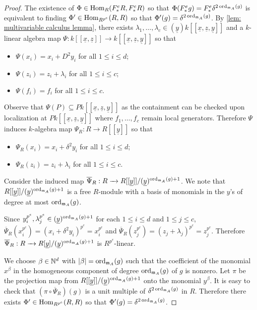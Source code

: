 \documentclass[12pt]{amsart}
\numberwithin{equation}{theorem}
\theoremstyle{plain}
\newcommand{\fm}{\mathfrak{m}}
\begin{document}
\begin{proof}
    The existence of $\Phi\in \operatorname{Hom}_R(F^e_*R,F^e_*R)$ so that $\Phi(F^e_*g) = F^e_*\delta^{2\ord_{\fm_A}(g)}$ is equivalent to finding $\Phi'\in \operatorname{Hom}_{R^{p^e}}(R,R)$ so that $\Phi'(g) = \delta^{2\ord_{\fm_A}(g)}$. By \cref{lem: multivariable calculus lemma}, there exists $\lambda_1,\ldots, \lambda_c\in (\underline{y})k[[\underline{x},\underline{z},\underline{y}]]$ and a $k$-linear algebra map $\Psi:k[[\underline{x},\underline{z}]]\to k[[\underline{x},\underline{z},\underline{y}]]$ so that 
    \begin{itemize}
        \item $\Psi(x_i) = x_i+D^2y_i$ for all $1\leq i\leq d$;
        \item $\Psi(z_i) = z_i + \lambda_i$ for all $1\leq i\leq c$;
        \item $\Psi(f_i) = f_i$ for all $1\leq i\leq c$.
    \end{itemize}
    Observe that $\Psi(P)\subseteq Pk[[\underline{x},\underline{z},\underline{y}]]$ as the containment can be checked upon localization at $Pk[[\underline{x},\underline{z},\underline{y}]]$ where $f_1,\ldots,f_c$ remain local generators. Therefore $\Psi$ induces $k$-algebra map $\Psi_R: R\to R[[\underline{y}]]$ so that 
    \begin{itemize}
        \item $\Psi_R(x_i) = x_i+\delta^2y_i$ for all $1\leq i\leq d$;
        \item $\Psi_R(z_i) = z_i + \lambda_i$ for all $1\leq i\leq c$.
    \end{itemize}
    Consider the induced map $\overline{\Psi}_R: R \to R[[\underline{y}]]/(\underline{y})^{\ord_{\fm_A}(g)+1}$. We note that $R[[\underline{y}]]/(\underline{y})^{\ord_{\fm_A}(g)+1}$ is a free $R$-module with a basis of monomials in the $y$'s of degree at most $\ord_{\fm_A}(g)$. 
    
    Since $y_i^{p^e},\lambda_j^{p^e}\in (\underline{y})^{\ord_{\fm_A}(g)+1}$ for each $1\leq i\leq d$ and $1\leq j\leq c$, $\overline{\Psi}_R(x_i^{p^e}) = (x_i + \delta^2 y_i)^{p^e} = x_i^{p^e}$ and $\overline{\Psi}_R(z_j^{p^e}) = (z_j+\lambda_j)^{p^e} = z_j^{p^e}$. Therefore $\overline{\Psi}_R: R\to R[\underline{y}]/(\underline{y})^{\ord_{\fm_A}(g)+1}$ is $R^{p^e}$-linear.

    We choose $\beta \in \mathbb{N}^d$ with $|\beta|= \ord_{\fm_A}(g)$ such that the coefficient of the monomial $x^{\beta}$ in the homogeneous component of degree $\ord_{\fm_A}(g)$ of $g$ is nonzero. Let $\pi$ be the projection map from $R[[\underline{y}]]/(\underline{y})^{\ord_{\fm_A}(g)+1}$ onto the monomial $y^{\beta}$. It is easy to check that $(\pi \circ \overline{\Psi}_R)(g)$ is a unit multiple of $\delta^{2\ord_{\fm_A}(g)}$ in $R$. Therefore there exists $\Phi'\in\operatorname{Hom}_{R^{p^e}}(R,R)$ so that $\Phi'(g) = \delta^{2\ord_{\fm_A}(g)}$.
    \end{proof}
    
\end{document}

